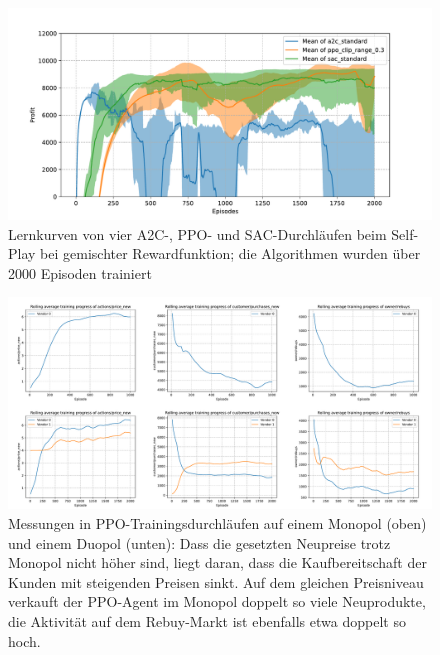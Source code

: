 \begin{figure}[htb]
	\centering
	\includegraphics[width=\textwidth]{appendix/self_play_mixed.pdf}
	\caption{Lernkurven von vier A2C-, PPO- und SAC-Durchläufen beim Self-Play bei gemischter Rewardfunktion; die Algorithmen wurden über 2000 Episoden trainiert}
	\label{graphic:SelfPlayMixedLearningCurve}
\end{figure}
\begin{figure}[htb]
	\centering
	\includegraphics[width=\textwidth]{appendix/ppo_monopoly_vs_doupoly.pdf}
	\caption{
		Messungen in PPO-Trainingsdurchläufen auf einem Monopol (oben) und einem Duopol (unten):
		Dass die gesetzten Neupreise trotz Monopol nicht höher sind, liegt daran, dass die Kaufbereitschaft der Kunden mit steigenden Preisen sinkt.
		Auf dem gleichen Preisniveau verkauft der PPO-Agent im Monopol doppelt so viele Neuprodukte, die Aktivität auf dem Rebuy-Markt ist ebenfalls etwa doppelt so hoch.
	}
	\label{graphic:PPOMonopolyDuopoly}
\end{figure}

